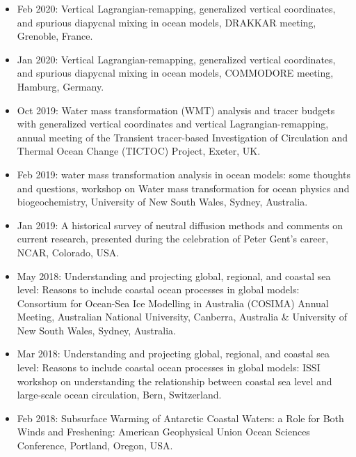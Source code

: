 \documentclass{article}
\begin{document}
\begin{itemize}[leftmargin=*]

\item Feb 2020: {\sc Vertical Lagrangian-remapping, generalized vertical coordinates, and spurious diapycnal mixing in ocean
  models}, DRAKKAR meeting, Grenoble, France. 
   
\item Jan 2020: {\sc Vertical Lagrangian-remapping, generalized vertical coordinates, and spurious diapycnal mixing in ocean
  models}, COMMODORE meeting, Hamburg, Germany. 

\item Oct 2019: {\sc Water mass transformation (WMT) analysis
  and tracer budgets with generalized vertical coordinates and vertical Lagrangian-remapping}, annual meeting of the Transient tracer-based Investigation of Circulation and Thermal Ocean Change (TICTOC) Project, Exeter, UK.

\item Feb 2019: {\sc water mass transformation analysis in ocean models: some thoughts and questions}, workshop on Water mass transformation for ocean physics and biogeochemistry, University of New South Wales, Sydney, Australia.  

\item Jan 2019: {\sc A historical survey of neutral diffusion methods and comments on current research}, presented during the celebration of Peter Gent's career, NCAR, Colorado, USA.  

\item May 2018: {\sc Understanding and projecting global, regional, and coastal sea level: Reasons to include coastal ocean processes in global models}: Consortium for Ocean-Sea Ice Modelling in Australia (COSIMA) Annual Meeting, Australian National University, Canberra, Australia \& University of New South Wales, Sydney, Australia. 

\item Mar 2018: {\sc Understanding and projecting global, regional, and coastal sea level: Reasons to include coastal ocean processes in global models}: ISSI workshop on understanding the relationship between coastal sea level and large-scale ocean circulation, Bern, Switzerland. 

\item Feb 2018: {\sc Subsurface Warming of Antarctic Coastal Waters: a Role for Both Winds and Freshening}: {\sc American Geophysical Union Ocean Sciences Conference}, Portland, Oregon, USA.


\end{itemize}
\end{document}
